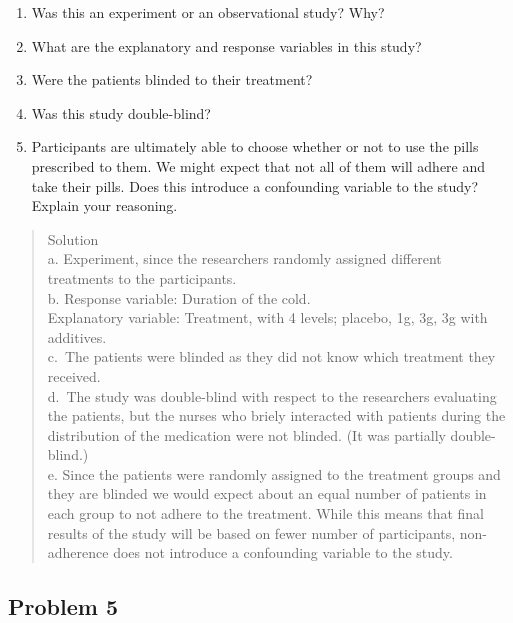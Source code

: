 \documentclass[
]{book}
\providecommand{\tightlist}{%
  \setlength{\itemsep}{0pt}\setlength{\parskip}{0pt}}
\begin{document}
\begin{enumerate}
\def\labelenumi{\alph{enumi}.}
\tightlist
\item
  Was this an experiment or an observational study? Why?\\
\item
  What are the explanatory and response variables in this study?\\
\item
  Were the patients blinded to their treatment?\\
\item
  Was this study double-blind?\\
\item
  Participants are ultimately able to choose whether or not to use the pills prescribed to them. We might expect that not all of them will adhere and take their pills. Does this introduce a confounding variable to the study? Explain your reasoning.
\end{enumerate}

\begin{quote}
Solution\\
a. Experiment, since the researchers randomly assigned different treatments to the participants.\\
b. Response variable: Duration of the cold.\\
Explanatory variable: Treatment, with 4 levels; placebo, 1g, 3g, 3g with additives.\\
c.~The patients were blinded as they did not know which treatment they received.\\
d.~The study was double-blind with respect to the researchers evaluating the patients, but the nurses who briely interacted with patients during the distribution of the medication were not blinded. (It was partially double-blind.)\\
e. Since the patients were randomly assigned to the treatment groups and they are blinded we would expect about an equal number of patients in each group to not adhere to the treatment. While this means that final results of the study will be based on fewer number of participants, non-adherence does not introduce a confounding variable to
the study.
\end{quote}

\hypertarget{problem-5}{%
\subsection{Problem 5}\label{problem-5}}
\end{document}

